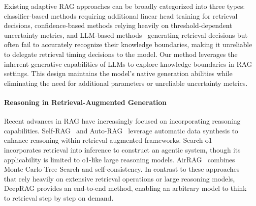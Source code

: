 Existing adaptive RAG approaches can be broadly categorized into three types: classifier-based methods \cite{cheng2024unified,jeong2024adaptive} requiring additional linear head training for retrieval decisions, confidence-based methods \cite{jiang2023flare,su-etal-2024-dragin,dhole2025retrieveretrieveuncertaintydetection} relying heavily on threshold-dependent uncertainty metrics, and LLM-based methods~\cite{asai2023self,zhang2024retrievalqa} generating retrieval decisions but often fail to accurately recognize their knowledge boundaries, making it unreliable to delegate retrieval timing decisions to the model.
% 
Our method leverages the inherent generative capabilities of LLMs to explore knowledge boundaries in RAG settings. This design maintains the model's native generation abilities while eliminating the need for additional parameters or unreliable uncertainty metrics.










\paragraph{Reasoning in Retrieval-Augmented Generation}
Recent advances in RAG have increasingly focused on incorporating reasoning capabilities. 
Self-RAG~\cite{asai2023self} and Auto-RAG~\cite{yu2024autorag} leverage automatic data synthesis to enhance reasoning within retrieval-augmented frameworks. 
Search-o1~\cite{li2025search} incorporates retrieval into inference to construct an agentic system, though its applicability is limited to o1-like large reasoning models.
AirRAG~\cite{feng2025airragactivatingintrinsicreasoning} combines Monte Carlo Tree Search and self-consistency.
% 
In contrast to these approaches that rely heavily on extensive retrieval operations or large reasoning models, DeepRAG provides an end-to-end method, enabling an arbitrary model to think to retrieval step by step on demand.


